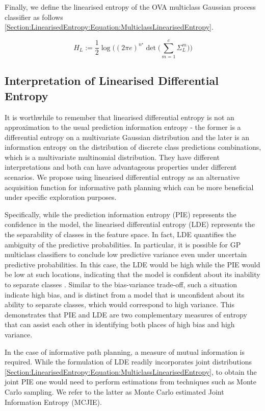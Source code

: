 \documentclass{article}
\begin{document}
			Finally, we define the linearised entropy of the OVA multiclass Gaussian process classifier as follows \eqref{Section:LinearisedEntropy:Equation:MulticlassLinearisedEntropy}.
			
			\begin{equation}
				H_{L} := \frac{1}{2} \log\Bigg((2 \pi e)^{n^{\star}} \det\bigg(\sum_{m = 1}^{c} \Sigma^{m}_{L}\bigg)\Bigg)
			\label{Section:LinearisedEntropy:Equation:MulticlassLinearisedEntropy}
			\end{equation}			
	
	\subsection{Interpretation of Linearised Differential Entropy}
	
		It is worthwhile to remember that linearised differential entropy is not an approximation to the usual prediction information entropy - the former is a differential entropy on a multivariate Gaussian distribution and the later is an information entropy on the distribution of discrete class predictions combinations, which is a multivariate multinomial distribution. They have different interpretations and both can have advantageous properties under different scenarios. We propose using linearised differential entropy as an alternative acquisition function for informative path planning which can be more beneficial under specific exploration purposes.
		
		Specifically, while the prediction information entropy (PIE) represents the confidence in the model, the linearised differential entropy (LDE) represents the the separability of classes in the feature space. In fact, LDE quantifies the ambiguity of the predictive probabilities. In particular, it is possible for GP multiclass classifiers to conclude low predictive variance even under uncertain predictive probabilities. In this case, the LDE would be high while the PIE would be low at such locations, indicating that the model is confident about its inability to separate classes \cite{AsherBender}. Similar to the bias-variance trade-off, such a situation indicate high bias, and is distinct from a model that is unconfident about its ability to separate classes, which would correspond to high variance. This demonstrates that PIE and LDE are two complementary measures of entropy that can assist each other in identifying both places of high bias and high variance.
		
		In the case of informative path planning, a measure of mutual information is required. While the formulation of LDE readily incorporates joint distributions \eqref{Section:LinearisedEntropy:Equation:MulticlassLinearisedEntropy}, to obtain the joint PIE one would need to perform estimations from techniques such as Monte Carlo sampling. We refer to the latter as Monte Carlo estimated Joint Information Entropy (MCJIE).
		
\end{document}
